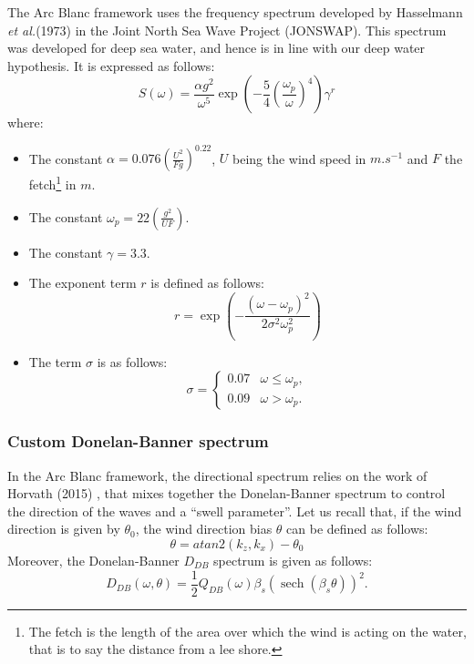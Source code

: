 \documentclass[11pt]{article}
\def\Framework{The Arc Blanc framework\xspace}
\def\framework{the Arc Blanc framework\xspace}
\def\etal{\emph{et al.}\xspace}
\begin{document}
\Framework uses the frequency spectrum developed by Hasselmann \etal (1973) \cite{k.hasselmannMeasurementsWindwaveGrowth1973} in the Joint North Sea Wave Project (JONSWAP).
This spectrum was developed for deep sea water, and hence is in line with our deep water hypothesis.
It is expressed as follows:
\begin{equation}
	S(\omega)=\frac{\alpha g^2}{\omega^5} \exp\left(-\frac{5}{4}\left(\frac{\omega_p}{\omega}\right)^4\right)\gamma^r
\end{equation}
where:
\begin{itemize}
	\item The constant $\alpha=0.076\left(\frac{U^2}{F g}\right)^{0.22}$, $U$ being the wind speed in $m.s^{-1}$ and $F$ the fetch\footnote{The fetch is the length of the area over which the wind is acting on the water, that is to say the distance from a lee shore.} in $m$.
	\item The constant $\omega_p=22\left(\frac{g^2}{U F}\right)$.
	\item The constant $\gamma=3.3$.
	\item The exponent term $r$ is defined as follows:
	      \begin{equation}
		      r=\exp\left(-\frac{\left(\omega-\omega_p\right)^2}{2 \sigma^2 \omega_p^2}\right)
	      \end{equation}
	\item The term $\sigma$ is as follows:
	      \[
		      \sigma=\begin{cases}
			      0.07 & \omega \leq \omega_p, \\
			      0.09 & \omega>\omega_p.
		      \end{cases}
	      \]
\end{itemize}

\subsubsection{Custom Donelan-Banner spectrum}
\label{subsubsec:donelanbanner}

In \framework, the directional spectrum relies on the work of Horvath (2015) \cite{horvathEmpiricalDirectionalWave2015}, that mixes together the Donelan-Banner spectrum to control the direction of the waves and a “swell parameter”.
Let us recall that, if the wind direction is given by $\theta_0$, the wind direction bias $\theta$ can be defined as follows:
\begin{equation}
	\theta = atan2(k_z, k_x) - \theta_0
\end{equation}
Moreover, the Donelan-Banner $D_{DB}$ spectrum is given as follows:
\begin{equation}
	D_{DB}\left(\omega,\theta\right)=\frac{1}{2}Q_{DB}\left(\omega\right)\beta_s\left(\operatorname{sech}\left(\beta_s\theta\right)\right)^2.
	\label{equa:ddb}
\end{equation}
\end{document}
